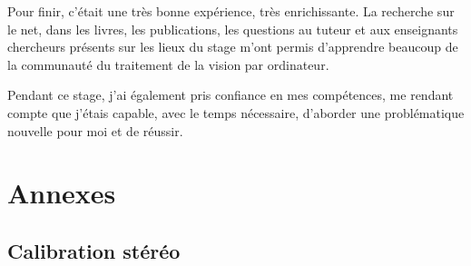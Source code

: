 \documentclass[12pt, french]{report}
\begin{document}
Pour finir, c'était une très bonne expérience, très enrichissante. La recherche sur le net, dans les livres, les publications, les questions au tuteur et aux enseignants chercheurs présents sur les lieux du stage m'ont permis d'apprendre beaucoup de la communauté du traitement de la vision par ordinateur.

Pendant ce stage, j'ai également pris confiance en mes compétences, me rendant compte que j'étais capable, avec le temps nécessaire, d'aborder une problématique nouvelle pour moi et de réussir. 


\newpage
\section{Annexes}

\subsection{Calibration stéréo}
\label{stereo_calib.cpp}
\end{document}

